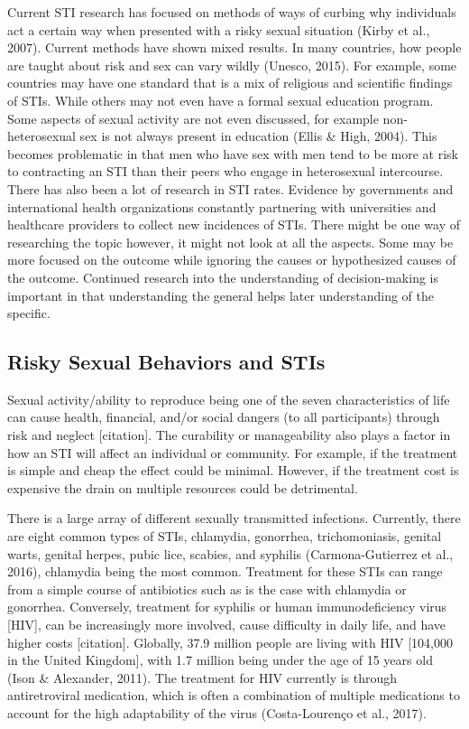 \documentclass[
  english,
  donotrepeattitle,doc, 12pt, a4paper,floatsintext]{apa7}
\begin{document}
Current STI research has focused on methods of ways of curbing why individuals act a certain way when presented with a risky sexual situation (Kirby et al., 2007). Current methods have shown mixed results. In many countries, how people are taught about risk and sex can vary wildly (Unesco, 2015). For example, some countries may have one standard that is a mix of religious and scientific findings of STIs. While others may not even have a formal sexual education program. Some aspects of sexual activity are not even discussed, for example non-heterosexual sex is not always present in education (Ellis \& High, 2004). This becomes problematic in that men who have sex with men tend to be more at risk to contracting an STI than their peers who engage in heterosexual intercourse. There has also been a lot of research in STI rates. Evidence by governments and international health organizations constantly partnering with universities and healthcare providers to collect new incidences of STIs. There might be one way of researching the topic however, it might not look at all the aspects. Some may be more focused on the outcome while ignoring the causes or hypothesized causes of the outcome. Continued research into the understanding of decision-making is important in that understanding the general helps later understanding of the specific.

\hypertarget{risky-sexual-behaviors-and-stis}{%
\subsection{Risky Sexual Behaviors and STIs}\label{risky-sexual-behaviors-and-stis}}

Sexual activity/ability to reproduce being one of the seven characteristics of life can cause health, financial, and/or social dangers (to all participants) through risk and neglect {[}citation{]}. The curability or manageability also plays a factor in how an STI will affect an individual or community. For example, if the treatment is simple and cheap the effect could be minimal. However, if the treatment cost is expensive the drain on multiple resources could be detrimental.

There is a large array of different sexually transmitted infections. Currently, there are eight common types of STIs, chlamydia, gonorrhea, trichomoniasis, genital warts, genital herpes, pubic lice, scabies, and syphilis (Carmona-Gutierrez et al., 2016), chlamydia being the most common. Treatment for these STIs can range from a simple course of antibiotics such as is the case with chlamydia or gonorrhea. Conversely, treatment for syphilis or human immunodeficiency virus {[}HIV{]}, can be increasingly more involved, cause difficulty in daily life, and have higher costs {[}citation{]}. Globally, 37.9 million people are living with HIV {[}104,000 in the United Kingdom{]}, with 1.7 million being under the age of 15 years old (Ison \& Alexander, 2011). The treatment for HIV currently is through antiretroviral medication, which is often a combination of multiple medications to account for the high adaptability of the virus (Costa-Lourenço et al., 2017).
\end{document}
